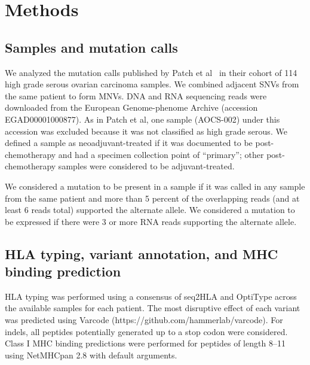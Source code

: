 \section*{Methods}

\subsection*{Samples and mutation calls}
We analyzed the mutation calls published by Patch et al~\cite{Patch_2015} in their cohort of 114 high grade serous ovarian carcinoma samples. We combined adjacent SNVs from the same patient to form MNVs. DNA and RNA sequencing reads were downloaded from the European Genome-phenome Archive (accession EGAD00001000877). As in Patch et al, one sample (AOCS-002) under this accession was excluded because it was not classified as high grade serous. We defined a sample as neoadjuvant-treated if it was documented to be post-chemotherapy and had a specimen collection point of ``primary''; other post-chemotherapy samples were considered to be adjuvant-treated.

We considered a mutation to be present in a sample if it was called in any sample from the same patient and more than 5 percent of the overlapping reads (and at least 6 reads total) supported the alternate allele. We considered a mutation to be expressed if there were 3 or more RNA reads supporting the alternate allele.


\subsection*{HLA typing, variant annotation, and MHC binding prediction}
HLA typing was performed using a consensus of seq2HLA\cite{Boegel_2012} and OptiType\cite{Szolek_2014} across the available samples for each patient. The most disruptive effect of each variant was predicted using Varcode (https://github.com/hammerlab/varcode). For indels, all peptides potentially generated up to a stop codon were considered. Class I MHC binding predictions were performed for peptides of length 8--11 using NetMHCpan 2.8\cite{Lundegaard_2008} with default arguments.

